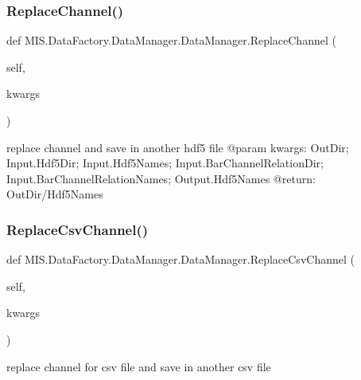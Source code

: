 \subsubsection{\texorpdfstring{Replace\+Channel()}{ReplaceChannel()}}
{\footnotesize\ttfamily def M\+I\+S.\+Data\+Factory.\+Data\+Manager.\+Data\+Manager.\+Replace\+Channel (\begin{DoxyParamCaption}\item[{}]{self,  }\item[{}]{kwargs }\end{DoxyParamCaption})}

\begin{DoxyVerb}replace channel and save in another hdf5 file
@param kwargs: OutDir; Input.Hdf5Dir; Input.Hdf5Names;
    Input.BarChannelRelationDir; Input.BarChannelRelationNames; Output.Hdf5Names
@return: OutDir/Hdf5Names
\end{DoxyVerb}
 \mbox{\label{classMIS_1_1DataFactory_1_1DataManager_1_1DataManager_a32e02ddea8bc393aeecf6c6cdfc66c00}} 
\subsubsection{\texorpdfstring{Replace\+Csv\+Channel()}{ReplaceCsvChannel()}}
{\footnotesize\ttfamily def M\+I\+S.\+Data\+Factory.\+Data\+Manager.\+Data\+Manager.\+Replace\+Csv\+Channel (\begin{DoxyParamCaption}\item[{}]{self,  }\item[{}]{kwargs }\end{DoxyParamCaption})}

\begin{DoxyVerb}replace channel for csv file and save in another csv file\end{DoxyVerb}
 \mbox{\label{classMIS_1_1DataFactory_1_1DataManager_1_1DataManager_aa014ab1564104265eff426ca085b1460}} 
